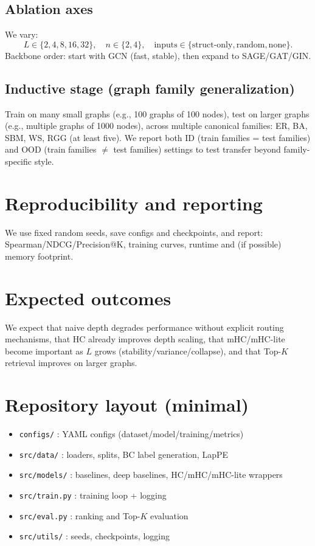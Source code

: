 \documentclass[11pt]{article}
\begin{document}
\subsection{Ablation axes}
We vary:
\[
L\in\{2,4,8,16,32\},\quad n\in\{2,4\},\quad \text{inputs}\in\{\text{struct-only},\text{random},\text{none}\}.
\]
Backbone order: start with GCN (fast, stable), then expand to SAGE/GAT/GIN.

\subsection{Inductive stage (graph family generalization)}
Train on many small graphs (e.g., 100 graphs of 100 nodes), test on larger graphs (e.g., multiple graphs of 1000 nodes), across multiple canonical families:
ER, BA, SBM, WS, RGG (at least five).
We report both ID (train families = test families) and OOD (train families $\neq$ test families) settings to test transfer beyond family-specific style.

\section{Reproducibility and reporting}
We use fixed random seeds, save configs and checkpoints, and report:
Spearman/NDCG/Precision@K, training curves, runtime and (if possible) memory footprint.

\section{Expected outcomes}
We expect that naive depth degrades performance without explicit routing mechanisms,
that HC already improves depth scaling,
that mHC/mHC-lite become important as $L$ grows (stability/variance/collapse),
and that Top-$K$ retrieval improves on larger graphs.

\section{Repository layout (minimal)}
\begin{itemize}[leftmargin=2em]
\item \texttt{configs/} : YAML configs (dataset/model/training/metrics)
\item \texttt{src/data/} : loaders, splits, BC label generation, LapPE
\item \texttt{src/models/} : baselines, deep baselines, HC/mHC/mHC-lite wrappers
\item \texttt{src/train.py} : training loop + logging
\item \texttt{src/eval.py} : ranking and Top-$K$ evaluation
\item \texttt{src/utils/} : seeds, checkpoints, logging
\end{itemize}
\end{document}
